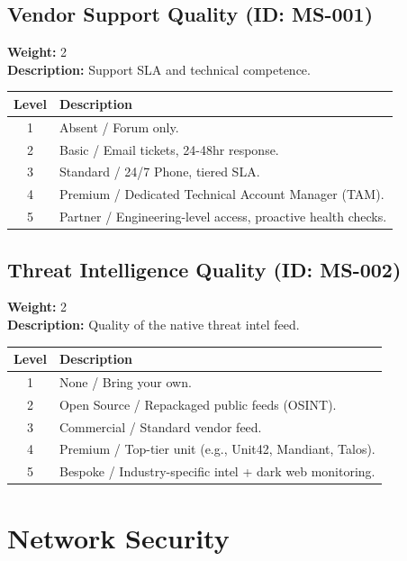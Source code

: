 \documentclass{article}
\begin{document}
\subsection{Vendor Support Quality (ID: MS-001)}
\textbf{Weight:} 2 \\
\textbf{Description:} Support SLA and technical competence.
\vspace{0.3cm}
\begin{longtable}{|c|p{12cm}|}
\hline
\rowcolor{lightgray} \textbf{Level} & \textbf{Description} \\ \hline
1 & Absent / Forum only. \\ \hline
2 & Basic / Email tickets, 24-48hr response. \\ \hline
3 & Standard / 24/7 Phone, tiered SLA. \\ \hline
4 & Premium / Dedicated Technical Account Manager (TAM). \\ \hline
5 & Partner / Engineering-level access, proactive health checks. \\ \hline
\end{longtable}
\vspace{0.5cm}
\subsection{Threat Intelligence Quality (ID: MS-002)}
\textbf{Weight:} 2 \\
\textbf{Description:} Quality of the native threat intel feed.
\vspace{0.3cm}
\begin{longtable}{|c|p{12cm}|}
\hline
\rowcolor{lightgray} \textbf{Level} & \textbf{Description} \\ \hline
1 & None / Bring your own. \\ \hline
2 & Open Source / Repackaged public feeds (OSINT). \\ \hline
3 & Commercial / Standard vendor feed. \\ \hline
4 & Premium / Top-tier unit (e.g., Unit42, Mandiant, Talos). \\ \hline
5 & Bespoke / Industry-specific intel + dark web monitoring. \\ \hline
\end{longtable}
\vspace{0.5cm}
\section{Network Security}
\end{document}
